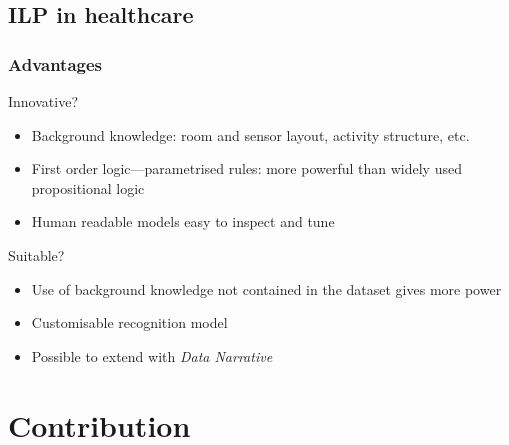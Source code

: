 \documentclass[09pt]{beamer}
\begin{document}
  \subsection{ILP in healthcare}
  \begin{frame}
    \frametitle{Advantages}
    \begin{block}{Innovative?}
      \begin{itemize}
        \item Background knowledge: room and sensor layout, activity structure, etc.\
        \item First order logic---parametrised rules: more powerful than widely used propositional logic
        \item Human readable models easy to inspect and tune
      \end{itemize}
    \end{block}
    \pause
    \begin{block}{Suitable?}
      \begin{itemize}
        \item Use of background knowledge not contained in the dataset gives more power
        \item Customisable recognition model
        \item Possible to extend with \emph{Data Narrative}
      \end{itemize}
    \end{block}
  \end{frame}

\section{Contribution}
\end{document}

